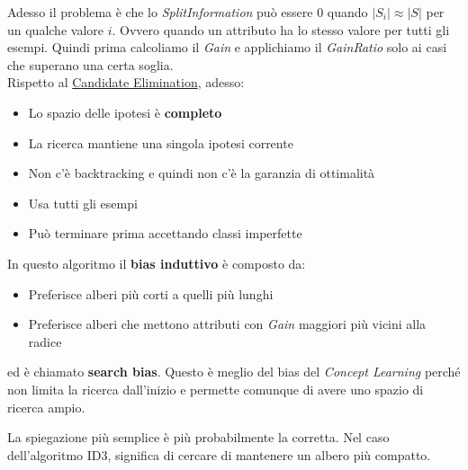 Adesso il problema è che lo \textit{SplitInformation} può essere $0$ quando $\lvert S_i \rvert \approx \lvert S \rvert$ per un qualche valore $i$. Ovvero quando un attributo ha lo stesso valore per tutti gli esempi. Quindi prima calcoliamo il \textit{Gain} e applichiamo il \textit{GainRatio} solo ai casi che superano una certa soglia.\\
Rispetto al \hyperref[alg:cand_elim]{Candidate Elimination}, adesso:
\begin{itemize}
	\item Lo spazio delle ipotesi è \textbf{completo}
	\item La ricerca mantiene una singola ipotesi corrente
	\item Non c'è backtracking e quindi non c'è la garanzia di ottimalità
	\item Usa tutti gli esempi
	\item Può terminare prima accettando classi imperfette
\end{itemize}

In questo algoritmo il \textbf{bias induttivo} è composto da:
\begin{itemize}
	\item Preferisce alberi più corti a quelli più lunghi
	\item Preferisce alberi che mettono attributi con \textit{Gain} maggiori più vicini alla radice
\end{itemize}
ed è chiamato \textbf{search bias}. Questo è meglio del bias del \textit{Concept Learning} perché non limita la ricerca dall'inizio e permette comunque di avere uno spazio di ricerca ampio.

\begin{definition}
	La spiegazione più semplice è più probabilmente la corretta. Nel caso dell'algoritmo ID3, significa di cercare di mantenere un albero più compatto.
\end{definition}

